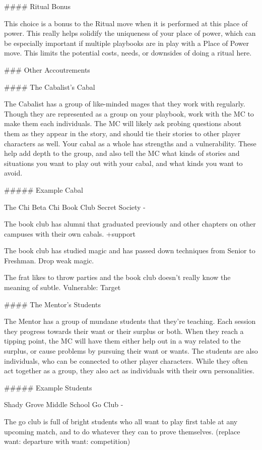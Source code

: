 \documentclass[
  oneside,
  statementpaper,
  9pt]{memoir}
\begin{document}
\begin{Player}
#### Ritual Bonus

This choice is a bonus to the Ritual move when it is performed at this place of power. This really helps solidify the uniqueness of your place of power, which can be especially important if multiple playbooks are in play with a Place of Power move. This limits the potential costs, needs, or downsides of doing a ritual here.

### Other Accoutrements

#### The Cabalist’s Cabal

The Cabalist has a group of like-minded mages that they work with regularly. Though they are represented as a group on your playbook, work with the MC to make them each individuals. The MC will likely ask probing questions about them as they appear in the story, and should tie their stories to other player characters as well. Your cabal as a whole has strengths and a vulnerability. These help add depth to the group, and also tell the MC what kinds of stories and situations you want to play out with your cabal, and what kinds you want to avoid. 

##### Example Cabal

The Chi Beta Chi Book Club Secret Society - 

The book club has alumni that graduated previously and other chapters on other campuses with their own cabals. +support

The book club has studied magic and has passed down techniques from Senior to Freshman. Drop weak magic.

The frat likes to throw parties and the book club doesn’t really know the meaning of subtle. Vulnerable: Target

#### The Mentor’s Students

The Mentor has a group of mundane students that they’re teaching. Each session they progress towards their want or their surplus or both. When they reach a tipping point, the MC will have them either help out in a way related to the surplus, or cause problems by pursuing their want or wants. The students are also individuals, who can be connected to other player characters. While they often act together as a group, they also act as individuals with their own personalities. 

##### Example Students

Shady Grove Middle School Go Club - 

The go club is full of bright students who all want to play first table at any upcoming match, and to do whatever they can to prove themselves. (replace want: departure with want: competition)


\end{Player}
\end{document}
